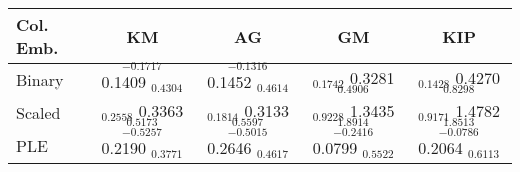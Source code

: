 \begin{tabular}{lcccc}
\toprule
Col. Emb. & KM & AG & GM & KIP \\
\midrule
Binary & $_{-0.1717}$ 0.1409 $_{0.4304}$ & $_{-0.1316}$ 0.1452 $_{0.4614}$ & $_{0.1742}$ 0.3281 $_{0.4906}$ & $_{0.1428}$ 0.4270 $_{0.8298}$ \\
Scaled & $_{0.2558}$ 0.3363 $_{0.5173}$ & $_{0.1814}$ 0.3133 $_{0.5597}$ & $_{0.9228}$ 1.3435 $_{1.8914}$ & $_{0.9171}$ 1.4782 $_{1.8513}$ \\
PLE & $_{-0.5257}$ 0.2190 $_{0.3771}$ & $_{-0.5015}$ 0.2646 $_{0.4617}$ & $_{-0.2416}$ 0.0799 $_{0.5522}$ & $_{-0.0786}$ 0.2064 $_{0.6113}$ \\
\bottomrule
\end{tabular}
